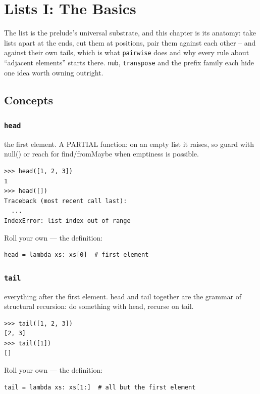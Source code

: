\documentclass[10pt,letterpaper]{book}
\begin{document}
\chapter{Lists I: The Basics}

The list is the prelude's universal substrate, and this chapter is its
anatomy: take lists apart at the ends, cut them at positions, pair them
against each other -- and against their own tails, which is what
\texttt{pairwise} does and why every rule about ``adjacent elements'' starts
there. \texttt{nub}, \texttt{transpose} and the prefix family each hide one
idea worth owning outright.
\section{Concepts}
\subsection{\texttt{head}}\label{def:head}
the first element. A PARTIAL function: on an empty list it raises, so guard with null() or reach for find/fromMaybe when emptiness is possible.
\begin{lstlisting}[style=ex]
>>> head([1, 2, 3])
1
>>> head([])
Traceback (most recent call last):
  ...
IndexError: list index out of range
\end{lstlisting}

Roll your own --- the definition:

\begin{lstlisting}[style=ex]
head = lambda xs: xs[0]  # first element
\end{lstlisting}

\subsection{\texttt{tail}}\label{def:tail}
everything after the first element. head and tail together are the grammar of structural recursion: do something with head, recurse on tail.
\begin{lstlisting}[style=ex]
>>> tail([1, 2, 3])
[2, 3]
>>> tail([1])
[]
\end{lstlisting}

Roll your own --- the definition:

\begin{lstlisting}[style=ex]
tail = lambda xs: xs[1:]  # all but the first element
\end{lstlisting}
\end{document}
